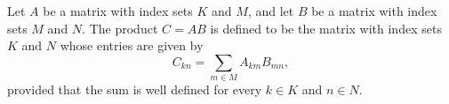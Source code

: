 Let $A$ be a matrix with index sets $K$ and $M$, and let $B$ be a matrix with index sets $M$ and $N$. The product $C = AB$ is defined to be the matrix with index sets $K$ and $N$ whose entries are given by
$$C_{kn} = \sum_{m \in M} A_{km} B_{mn},$$
provided that the sum is well defined for every $k \in K$ and $n \in N$.
